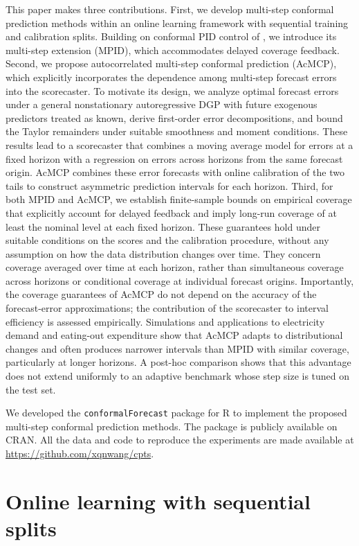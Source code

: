 \documentclass[
  american,
  12pt]{article}
\theoremstyle{plain}
\theoremstyle{plain}
\theoremstyle{remark}
\begin{document}
This paper makes three contributions. First, we develop multi-step
conformal prediction methods within an online learning framework with
sequential training and calibration splits. Building on conformal PID
control of \citet{angelopoulos2024}, we introduce its multi-step
extension (MPID), which accommodates delayed coverage feedback. Second,
we propose autocorrelated multi-step conformal prediction (AcMCP), which
explicitly incorporates the dependence among multi-step forecast errors
into the scorecaster. To motivate its design, we analyze optimal
forecast errors under a general nonstationary autoregressive DGP with
future exogenous predictors treated as known, derive first-order error
decompositions, and bound the Taylor remainders under suitable
smoothness and moment conditions. These results lead to a scorecaster
that combines a moving average model for errors at a fixed horizon with
a regression on errors across horizons from the same forecast origin.
AcMCP combines these error forecasts with online calibration of the two
tails to construct asymmetric prediction intervals for each horizon.
Third, for both MPID and AcMCP, we establish finite-sample bounds on
empirical coverage that explicitly account for delayed feedback and
imply long-run coverage of at least the nominal level at each fixed
horizon. These guarantees hold under suitable conditions on the scores
and the calibration procedure, without any assumption on how the data
distribution changes over time. They concern coverage averaged over time
at each horizon, rather than simultaneous coverage across horizons or
conditional coverage at individual forecast origins. Importantly, the
coverage guarantees of AcMCP do not depend on the accuracy of the
forecast-error approximations; the contribution of the scorecaster to
interval efficiency is assessed empirically. Simulations and
applications to electricity demand and eating-out expenditure show that
AcMCP adapts to distributional changes and often produces narrower
intervals than MPID with similar coverage, particularly at longer
horizons. A post-hoc comparison shows that this advantage does not
extend uniformly to an adaptive benchmark whose step size is tuned on
the test set.

We developed the \texttt{conformalForecast} package for R to implement
the proposed multi-step conformal prediction methods. The package is
publicly available on CRAN. All the data and code to reproduce the
experiments are made available at \url{https://github.com/xqnwang/cpts}.

\section{Online learning with sequential splits}\label{sec-setup}
\end{document}
